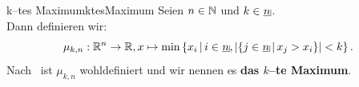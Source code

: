 \begin{definition}{k--tes Maximum}{ktesMaximum}
Seien $n \in \mathbb{N}$ und $k \in \haken n$.\\
Dann definieren wir:
\[\mu_{k, n}:\R^n \rightarrow \R, 
x\mapsto \min\menge{x_i}{i\in\haken n,\abs{\menge{j\in\haken n}{x_j>x_i}}<k}
\text.\]
Nach~ ist $\mu_{k,n}$
wohldefiniert und wir nennen es \textbf{das $k$--te Maximum}.
\end{definition}